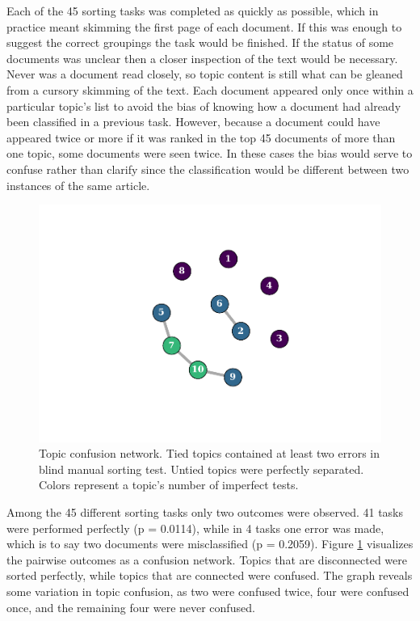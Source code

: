 \documentclass[]{book}
\theoremstyle{definition}
\theoremstyle{definition}
\theoremstyle{definition}
\theoremstyle{remark}
\begin{document}
Each of the 45 sorting tasks was completed as quickly as possible, which
in practice meant skimming the first page of each document. If this was
enough to suggest the correct groupings the task would be finished. If
the status of some documents was unclear then a closer inspection of the
text would be necessary. Never was a document read closely, so topic
content is still what can be gleaned from a cursory skimming of the
text. Each document appeared only once within a particular topic's list
to avoid the bias of knowing how a document had already been classified
in a previous task. However, because a document could have appeared
twice or more if it was ranked in the top 45 documents of more than one
topic, some documents were seen twice. In these cases the bias would
serve to confuse rather than clarify since the classification would be
different between two instances of the same article.

\begin{figure}

{\centering \includegraphics[width=0.9\linewidth]{03_files/figure-latex/man-con-1} 

}

\caption{Topic confusion network. Tied topics contained at least two errors in blind manual sorting test. Untied topics were perfectly separated. Colors represent a topic's number of imperfect tests.}\label{fig:man-con}
\end{figure}

Among the 45 different sorting tasks only two outcomes were observed. 41
tasks were performed perfectly (p = 0.0114), while in 4 tasks one error
was made, which is to say two documents were misclassified (p = 0.2059).
Figure \ref{fig:man-con} visualizes the pairwise outcomes as a confusion
network. Topics that are disconnected were sorted perfectly, while
topics that are connected were confused. The graph reveals some
variation in topic confusion, as two were confused twice, four were
confused once, and the remaining four were never confused.
\end{document}
